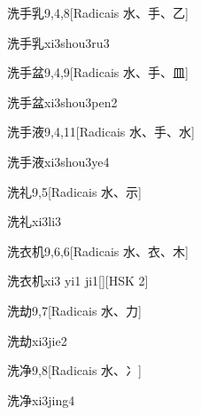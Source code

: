 \begin{entry}{洗手乳}{9,4,8}[Radicais ⽔、⼿、⼄]
  \begin{phonetics}{洗手乳}{xi3shou3ru3}
  \end{phonetics}
\end{entry}

\begin{entry}{洗手盆}{9,4,9}[Radicais ⽔、⼿、⽫]
  \begin{phonetics}{洗手盆}{xi3shou3pen2}
  \end{phonetics}
\end{entry}

\begin{entry}{洗手液}{9,4,11}[Radicais ⽔、⼿、⽔]
  \begin{phonetics}{洗手液}{xi3shou3ye4}
  \end{phonetics}
\end{entry}

\begin{entry}{洗礼}{9,5}[Radicais ⽔、⽰]
  \begin{phonetics}{洗礼}{xi3li3}
  \end{phonetics}
\end{entry}

\begin{entry}{洗衣机}{9,6,6}[Radicais ⽔、⾐、⽊]
  \begin{phonetics}{洗衣机}{xi3 yi1 ji1}[][HSK 2]
  \end{phonetics}
\end{entry}

\begin{entry}{洗劫}{9,7}[Radicais ⽔、⼒]
  \begin{phonetics}{洗劫}{xi3jie2}
  \end{phonetics}
\end{entry}

\begin{entry}{洗净}{9,8}[Radicais ⽔、⼎]
  \begin{phonetics}{洗净}{xi3jing4}
  \end{phonetics}
\end{entry}

